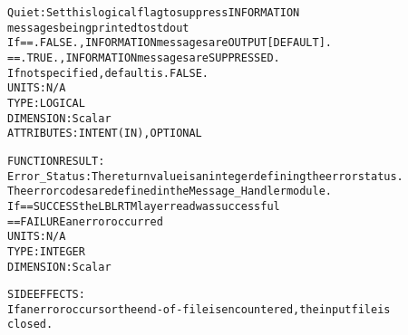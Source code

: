 \begin{alltt}
        Quiet:         Set this logical flag to suppress INFORMATION
                       messages being printed to stdout
                       If == .FALSE., INFORMATION messages are OUTPUT [DEFAULT].
                          == .TRUE.,  INFORMATION messages are SUPPRESSED.
                       If not specified, default is .FALSE.
                       UNITS:      N/A
                       TYPE:       LOGICAL
                       DIMENSION:  Scalar
                       ATTRIBUTES: INTENT(IN), OPTIONAL
 
  FUNCTION RESULT:
        Error_Status:  The return value is an integer defining the error status.
                       The error codes are defined in the Message_Handler module.
                       If == SUCCESS the LBLRTM layer read was successful
                          == FAILURE an error occurred
                       UNITS:      N/A
                       TYPE:       INTEGER
                       DIMENSION:  Scalar
 
  SIDE EFFECTS:
        If an error occurs or the end-of-file is encountered, the input file is
        closed.
 
  \end{alltt}
